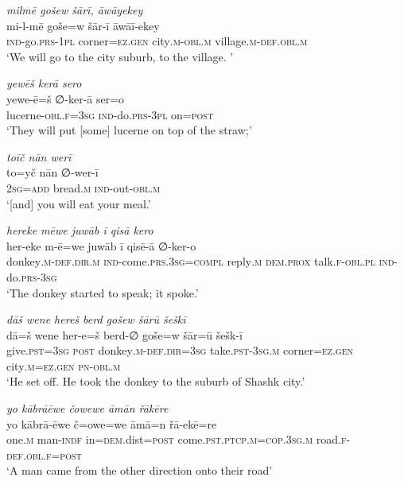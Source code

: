 \ea \label{HB.33}
\textit{milmē gošew šārī, āwāyekey} \\ 
\gll mi-l-mē goše=w šār-ī āwāī-ekey \\ 
 \textsc{ind-}go\textsc{.prs}\textsc{-1pl} corner\textsc{=ez}\textsc{.gen} city\textsc{.m}\textsc{-obl}\textsc{.m} village\textsc{.m}\textsc{-def}\textsc{.obl}\textsc{.m} \\ 
\glt `We will go to the city suburb, to the village. '
\z 
 
\ea \label{HB.37}
\textit{yewēš kerā sero} \\ 
\gll yewe-ē=š ∅-ker-ā ser=o \\ 
 lucerne\textsc{-obl}\textsc{\textsc{.f}}\textsc{=3sg} \textsc{ind-}do\textsc{.prs}\textsc{-3pl} on\textsc{=\textsc{post}} \\ 
\glt `They will put [some] lucerne on top of the straw;'
\z 
 
\ea \label{HB.41}
\textit{toīč nān werī} \\ 
\gll to=yč nān ∅-wer-ī \\ 
 \textsc{2sg}\textsc{=add} bread\textsc{.m} \textsc{ind-}out\textsc{-obl}\textsc{.m} \\ 
\glt `[and] you will eat your meal.'
\z 
 
\ea \label{HB.44}
\textit{hereke mēwe juwāb ī qisā kero} \\ 
\gll her-eke m-ē=we juwāb ī qisē-ā ∅-ker-o \\ 
 donkey\textsc{.m}\textsc{-def}\textsc{.dir}\textsc{.m} \textsc{ind-}come\textsc{.prs}\textsc{.3sg}\textsc{=compl} reply\textsc{.m} \textsc{dem.prox} talk\textsc{\textsc{.f}}\textsc{-obl}\textsc{.pl} \textsc{ind-}do\textsc{.prs}\textsc{-3sg} \\ 
\glt `The donkey started to speak; it spoke.'
\z 
 
\ea \label{HB.48}
\textit{dāš wene hereš berd gošew šārū šeškī} \\ 
\gll dā=š wene her-e=š berd-∅ goše=w šār=ū šešk-ī \\ 
 give\textsc{.pst}\textsc{=3sg} \textsc{post} donkey\textsc{.m}\textsc{-def}\textsc{.dir}\textsc{=3sg} take\textsc{.pst}\textsc{-3sg}\textsc{.m} corner\textsc{=ez}\textsc{.gen} city\textsc{.m}\textsc{=ez}\textsc{.gen} \textsc{pn}\textsc{-obl}\textsc{.m} \\ 
\glt `He set off. He took the donkey to the suburb of Shashk city.'
\z 
 
\ea \label{HB.49}
\textit{yo kābrāēwe čowewe āmān řākēre} \\ 
\gll yo kābrā-ēwe č=owe=we āmā=n řā-ekē=re \\ 
 one\textsc{.m} man\textsc{-indf} in\textsc{=dem}.dist\textsc{=\textsc{post}} come\textsc{.pst}\textsc{.ptcp}\textsc{.m}\textsc{=cop}\textsc{.3sg}\textsc{.m} road\textsc{\textsc{.f}}\textsc{-def}\textsc{.obl}\textsc{\textsc{.f}}\textsc{=\textsc{post}} \\ 
\glt `A man came from the other direction onto their road'
\z 
 
